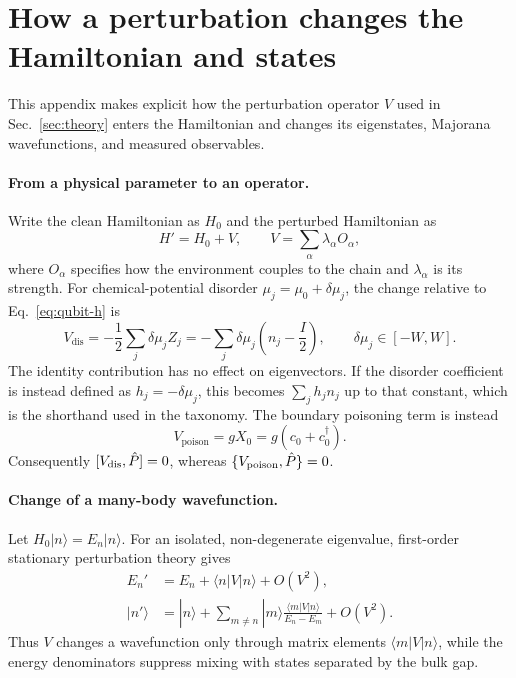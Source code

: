 \section{How a perturbation changes the Hamiltonian and states}
\label{app:perturbation}

This appendix makes explicit how the perturbation operator $V$ used in
Sec.~\ref{sec:theory} enters the Hamiltonian and changes its eigenstates,
Majorana wavefunctions, and measured observables.

\paragraph{From a physical parameter to an operator.}
Write the clean Hamiltonian as $H_0$ and the perturbed Hamiltonian as
\begin{equation}
 H'=H_0+V, \qquad V=\sum_\alpha \lambda_\alpha O_\alpha,
 \label{eq:app-general-v}
\end{equation}
where $O_\alpha$ specifies how the environment couples to the chain and
$\lambda_\alpha$ is its strength. For chemical-potential disorder
$\mu_j=\mu_0+\delta\mu_j$, the change relative to Eq.~\eqref{eq:qubit-h} is
\begin{equation}
 V_{\mathrm{dis}}
 =-\frac{1}{2}\sum_j\delta\mu_j Z_j
 =-\sum_j\delta\mu_j\left(n_j-\frac{I}{2}\right),
 \qquad \delta\mu_j\in[-W,W].
 \label{eq:app-vdis}
\end{equation}
The identity contribution has no effect on eigenvectors. If the disorder
coefficient is instead defined as $h_j=-\delta\mu_j$, this becomes
$\sum_j h_j n_j$ up to that constant, which is the shorthand used in the
taxonomy. The boundary poisoning term is instead
\begin{equation}
 V_{\mathrm{poison}}=gX_0=g(c_0+c_0^\dagger).
 \label{eq:app-vpoison}
\end{equation}
Consequently $[V_{\mathrm{dis}},\hat{P}]=0$, whereas
$\{V_{\mathrm{poison}},\hat{P}\}=0$.

\paragraph{Change of a many-body wavefunction.}
Let $H_0|n\rangle=E_n|n\rangle$. For an isolated, non-degenerate eigenvalue,
first-order stationary perturbation theory gives
\begin{align}
 E_n'&=E_n+\langle n|V|n\rangle+O(V^2),\\
 |n'\rangle&=|n\rangle+
 \sum_{m\ne n}|m\rangle
 \frac{\langle m|V|n\rangle}{E_n-E_m}+O(V^2).
 \label{eq:app-state-response}
\end{align}
Thus $V$ changes a wavefunction only through matrix elements
$\langle m|V|n\rangle$, while the energy denominators suppress mixing with
states separated by the bulk gap.

